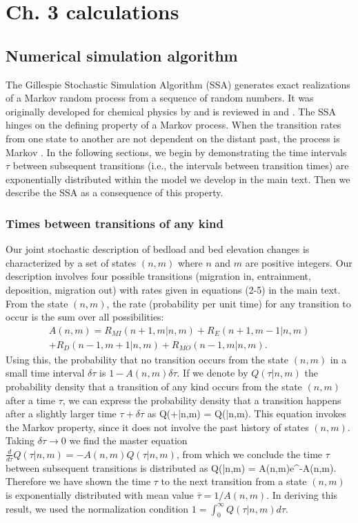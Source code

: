 

\chapter{Ch. 3 calculations}

\section{Numerical simulation algorithm}

The Gillespie Stochastic Simulation Algorithm (SSA) generates exact realizations of a Markov random process from a sequence of random numbers.
It was originally developed for chemical physics by \citet{Gillespie1977} and is reviewed in \citet{Gillespie1992} and \citet{Gillespie2007}.
The SSA hinges on the defining property of a Markov process. When the transition rates from one state to another are not dependent on the distant past, the process is Markov \citep[e.g.,][]{Cox1965}.
In the following sections, we begin by demonstrating the time intervals $\tau$ between subsequent transitions (i.e., the intervals between transition times) are exponentially distributed within the model we develop in the main text. Then we describe the SSA as a consequence of this property.

\subsection{Times between transitions of any kind}
Our joint stochastic description of bedload and bed elevation changes is characterized by a set of states $(n,m)$ where $n$ and $m$ are positive integers. 
Our description involves four possible transitions (migration in, entrainment, deposition, migration out) with rates given in equations (2-5) in the main text.
From the state $(n,m)$, the rate (probability per unit time) for any transition to occur is the sum over all possibilities:
\begin{multline} A(n,m) = R_{MI}(n+1,m|n,m) + R_E(n+1,m-1|n,m) \\+ R_D(n-1,m+1|n,m) + R_{MO}(n-1,m|n,m).\end{multline}
Using this, the probability that no transition occurs from the state $(n,m)$ in a small time interval $\delta \tau$ is $1-A(n,m)\delta \tau$. If we denote by $Q(\tau|n,m)$ the probability density that a transition of any kind occurs from the state $(n,m)$ after a time $\tau$, we can express the probability density that a transition happens after a slightly larger time $\tau + \delta \tau$ as 
\be Q(\tau+\delta \tau|n,m) = Q(\tau|n,m).\ee
This equation invokes the Markov property, since it does not involve the past history of states $(n,m)$. Taking $\delta\tau \rightarrow 0 $ we find the master equation $\frac{d}{d\tau}Q(\tau|n,m) = -A(n,m)Q(\tau|n,m)$, from which we conclude the time $\tau$ between subsequent transitions is distributed as 
\be Q(\tau|n,m) = A(n,m)e^{-A(n,m)\tau}. \label{eq:exp}\ee
Therefore we have shown the time $\tau$ to the next transition from a state $(n,m)$ is exponentially distributed with mean value $\bar{\tau} = 1/A(n,m).$ In deriving this result, we used the normalization condition $1 = \int_0^\infty Q(\tau|n,m)d\tau.$

